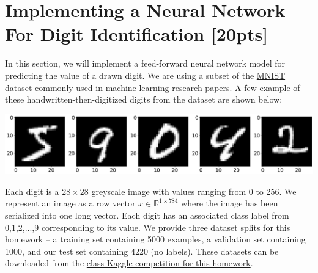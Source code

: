\documentclass[a4paper,10pt]{article}
\begin{document}
\section{Implementing a Neural Network For Digit Identification [20pts]}
\vspace{-10pt}
 In this section, we will implement a feed-forward neural network model for predicting the value of a drawn digit. We are using a subset of the \href{http://yann.lecun.com/exdb/mnist/}{MNIST} dataset commonly used in machine learning research papers. A few example of these handwritten-then-digitized digits from the dataset are shown below:

\hspace{-15pt}\includegraphics[width=\textwidth]{figures/mnist.png}

\noindent Each digit is a $28\times28$ greyscale image with values ranging from 0 to 256. We represent an image as a row vector $x \in \mathbb{R}^{1\times 784}$ where the image has been serialized into one long vector. Each digit has an associated class label from 0,1,2,...,9 corresponding to its value. We provide three dataset splits for this homework -- a training set containing 5000 examples, a validation set containing 1000, and our test set containing 4220 (no labels). These datasets can be downloaded from the \href{https://www.kaggle.com/t/c4de5ee4c2ef45858c15e3183d24b2c0}{class Kaggle competition for this homework}.
\end{document}
